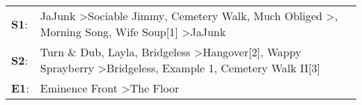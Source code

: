 \begin{supertabular}{p{0.03\textwidth}p{0.92\textwidth}}
 \textbf{S1}:  &  JaJunk\textsuperscript{} \textgreater \enspace Sociable Jimmy\textsuperscript{}, \enspace Cemetery Walk\textsuperscript{}, \enspace Much Obliged\textsuperscript{} \textgreater {}\textsuperscript{}, \enspace Morning Song\textsuperscript{}, \enspace Wife Soup[1]\textsuperscript{} \textgreater \enspace JaJunk\textsuperscript{}  \enspace  \\
 \textbf{S2}:  &  Turn \& Dub\textsuperscript{}, \enspace Layla\textsuperscript{}, \enspace Bridgeless\textsuperscript{} \textgreater \enspace Hangover[2]\textsuperscript{}, \enspace Wappy Sprayberry\textsuperscript{} \textgreater \enspace Bridgeless\textsuperscript{}, \enspace Example 1\textsuperscript{}, \enspace Cemetery Walk II[3]\textsuperscript{}  \enspace  \\
 \textbf{E1}:  &                                                                                                                                                                                                                                                                Eminence Front\textsuperscript{} \textgreater \enspace The Floor\textsuperscript{}  \enspace  \\
\end{supertabular}

